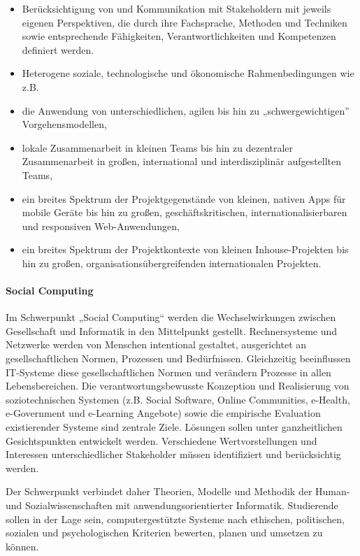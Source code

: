\begin{itemize}
\tightlist
\item
  Berücksichtigung von und Kommunikation mit Stakeholdern mit jeweils
  eigenen Perspektiven, die durch ihre Fachsprache, Methoden und
  Techniken sowie entsprechende Fähigkeiten, Verantwortlichkeiten und
  Kompetenzen definiert werden.
\item
  Heterogene soziale, technologische und ökonomische Rahmenbedingungen
  wie z.B.
\item
  die Anwendung von unterschiedlichen, agilen bis hin zu
  „schwergewichtigen'' Vorgehensmodellen,
\item
  lokale Zusammenarbeit in kleinen Teams bis hin zu dezentraler
  Zusammenarbeit in großen, international und interdisziplinär
  aufgestellten Teams,
\item
  ein breites Spektrum der Projektgegenstände von kleinen, nativen Apps
  für mobile Geräte bis hin zu großen, geschäftskritischen,
  internationalisierbaren und responsiven Web-Anwendungen,
\item
  ein breites Spektrum der Projektkontexte von kleinen Inhouse-Projekten
  bis hin zu großen, organisationsübergreifenden internationalen
  Projekten.
\end{itemize}

\paragraph{Social Computing}\label{social-computing}

Im Schwerpunkt „Social Computing`` werden die Wechselwirkungen zwischen
Gesellschaft und Informatik in den Mittelpunkt gestellt. Rechnersysteme
und Netzwerke werden von Menschen intentional gestaltet, ausgerichtet an
gesellschaftlichen Normen, Prozessen und Bedürfnissen. Gleichzeitig
beeinflussen IT-Systeme diese gesellschaftlichen Normen und verändern
Prozesse in allen Lebensbereichen. Die verantwortungsbewusste Konzeption
und Realisierung von soziotechnischen Systemen (z.B. Social Software,
Online Communities, e-Health, e-Government und e-Learning Angebote)
sowie die empirische Evaluation existierender Systeme sind zentrale
Ziele. Lösungen sollen unter ganzheitlichen Gesichtspunkten entwickelt
werden. Verschiedene Wertvorstellungen und Interessen unterschiedlicher
Stakeholder müssen identifiziert und berücksichtig werden.

Der Schwerpunkt verbindet daher Theorien, Modelle und Methodik der
Human- und Sozialwissenschaften mit anwendungsorientierter Informatik.
Studierende sollen in der Lage sein, computergestützte Systeme nach
ethischen, politischen, sozialen und psychologischen Kriterien bewerten,
planen und umsetzen zu können.

